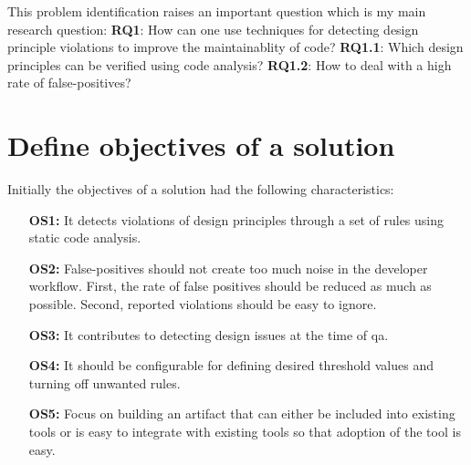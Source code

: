 \documentclass{report}
\begin{document}
\hfill \newline
This problem identification raises an important question which is my main research question:
\hfill \newline
\hfill \newline
\textbf{RQ1}: How can one use techniques for detecting design principle violations to improve the maintainablity of code? \newline
\textbf{RQ1.1}: Which design principles can be verified using code analysis? \newline
\textbf{RQ1.2}: How to deal with a high rate of false-positives? 


\section{Define objectives of a solution}
\label{objectives-of-solution}


Initially the objectives of a solution had the following characteristics:

\begin{itemize}
    \item [\textbf{OS1:}] It detects violations of design principles through a set of rules using static code analysis.
    \item [\textbf{OS2:}] False-positives should not create too much noise in the developer workflow. First, the rate of false positives should be reduced as much as possible. Second, reported violations should be easy to ignore. 
    \item [\textbf{OS3:}] It contributes to detecting design issues at the time of \gls{qa}.
    
    \item [\textbf{OS4:}] It should be configurable for defining desired threshold values and turning off unwanted rules.
    \item [\textbf{OS5:}] Focus on building an artifact that can either be included into existing tools or is easy to integrate with existing tools so that adoption of the tool is easy.
\end{itemize}
\end{document}
